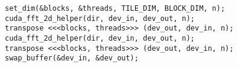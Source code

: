 \lstset{language=C++}
\begin{lstlisting}
set_dim(&blocks, &threads, TILE_DIM, BLOCK_DIM, n);    
cuda_fft_2d_helper(dir, dev_in, dev_out, n);
transpose <<<blocks, threads>>> (dev_out, dev_in, n);
cuda_fft_2d_helper(dir, dev_in, dev_out, n);
transpose <<<blocks, threads>>> (dev_out, dev_in, n);
swap_buffer(&dev_in, &dev_out);
\end{lstlisting}